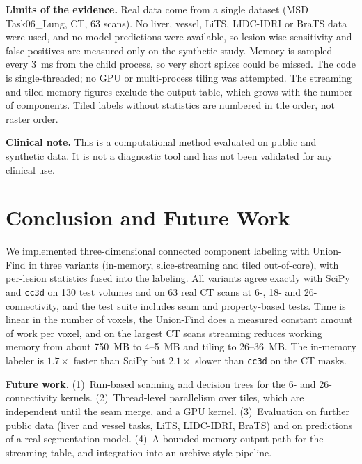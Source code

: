 \documentclass[11pt,a4paper]{article}
\begin{document}
\textbf{Limits of the evidence.} Real data come from a single dataset (MSD Task06\_Lung, CT, 63 scans). No liver, vessel, LiTS, LIDC-IDRI or BraTS data were used, and no model predictions were available, so lesion-wise sensitivity and false positives are measured only on the synthetic study. Memory is sampled every 3~ms from the child process, so very short spikes could be missed. The code is single-threaded; no GPU or multi-process tiling was attempted. The streaming and tiled memory figures exclude the output table, which grows with the number of components. Tiled labels without statistics are numbered in tile order, not raster order.

\textbf{Clinical note.} This is a computational method evaluated on public and synthetic data. It is not a diagnostic tool and has not been validated for any clinical use.

\section{Conclusion and Future Work}
We implemented three-dimensional connected component labeling with Union-Find in three variants (in-memory, slice-streaming and tiled out-of-core), with per-lesion statistics fused into the labeling. All variants agree exactly with SciPy and \texttt{cc3d} on 130 test volumes and on 63 real CT scans at 6-, 18- and 26-connectivity, and the test suite includes seam and property-based tests. Time is linear in the number of voxels, the Union-Find does a measured constant amount of work per voxel, and on the largest CT scans streaming reduces working memory from about 750~MB to 4--5~MB and tiling to 26--36~MB. The in-memory labeler is $1.7\times$ faster than SciPy but $2.1\times$ slower than \texttt{cc3d} on the CT masks.

\textbf{Future work.} (1)~Run-based scanning and decision trees for the 6- and 26-connectivity kernels. (2)~Thread-level parallelism over tiles, which are independent until the seam merge, and a GPU kernel. (3)~Evaluation on further public data (liver and vessel tasks, LiTS, LIDC-IDRI, BraTS) and on predictions of a real segmentation model. (4)~A bounded-memory output path for the streaming table, and integration into an archive-style pipeline.
\end{document}
